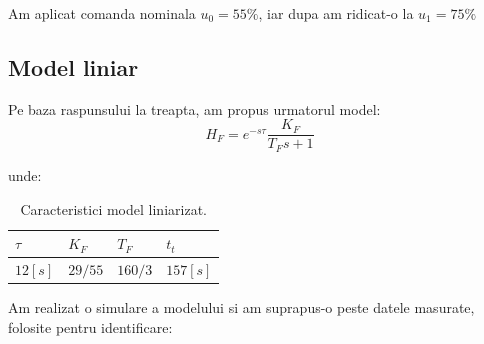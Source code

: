 \documentclass[12pt,english]{article}
\begin{document}
Am aplicat comanda nominala $u_0 = 55\%$, iar dupa am ridicat-o la $u_1 = 75\%$
\begin{figure}[H]
  \centering
\end{figure}

\subsection {Model liniar}
Pe baza raspunsului la treapta, am propus urmatorul model:
\begin{equation*}
H_{F} =e^{-s\tau }\frac{K_{F}}{T_{F} s+1}
\end{equation*}

unde:
\begin{table}[H]
  \centering
  \begin{tabular}{|l|l|l|l|}
    \hline
    $\tau$ & $K_F$ & $T_F$ & $t_t$ \\
    \hline
    $12 [s]$ & $29/55$ & $160/3$ & $157 [s]$ \\
    \hline
  \end{tabular}
  \caption{Caracteristici model liniarizat.}
\end{table}

Am realizat o simulare a modelului si am suprapus-o peste datele masurate, folosite pentru identificare:

\begin{figure}[H]
  \centering
\end{figure}
\end{document}
